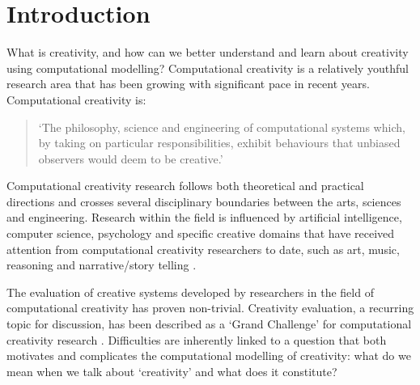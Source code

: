 \documentclass[10pt,letterpaper]{article}
\begin{document}
\linenumbers

\section*{Introduction}\label{intro}


What is creativity, and how can we better understand and learn about creativity using computational modelling? Computational creativity is a relatively youthful research area that has been growing with significant pace in recent years. Computational creativity is: 
\begin{quote}`The philosophy, science and engineering of computational systems which, by taking on particular responsibilities, exhibit behaviours that unbiased observers would deem to be creative.' 
\cite[p. 21]{coltonwiggins12}
\end{quote}

Computational creativity research follows both theoretical and practical directions and crosses several disciplinary boundaries between the arts, sciences and engineering. Research within the field is influenced by artificial intelligence, computer science, psychology and specific creative domains that have received attention from computational creativity researchers to date, such as art, music, reasoning and narrative/story telling \cite[provide examples]{colton08,widmerAIM09,leon10MM,perezyperez99}. 

The evaluation of creative systems developed by researchers in the field of computational creativity has proven non-trivial. Creativity evaluation, a recurring topic for discussion, has been described as a `Grand Challenge' for computational creativity research \cite{cardoso09}. Difficulties are inherently linked to a question that both motivates and complicates the computational modelling of creativity: what  do we mean when we talk about `creativity' and what does it constitute?
\end{document}
